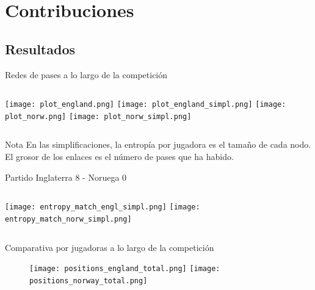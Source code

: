 \documentclass{beamer}
\begin{document}
\section{Contribuciones}

\subsection{Resultados}

\begin{frame}{Redes de pases a lo largo de la competición}
    \begin{columns}[t]
        \texttt{[image: plot\_england.png]}
        \texttt{[image: plot\_england\_simpl.png]}
        \texttt{[image: plot\_norw.png]}
        \texttt{[image: plot\_norw\_simpl.png]}
    \end{columns} 
	\begin{alertblock}{Nota}
		\textlatin{En las simplificaciones, la entropía por jugadora es el tamaño de cada nodo. El grosor de los enlaces es el 
	 	número de pases que ha habido.}
	\end{alertblock}
\end{frame}

\begin{frame}{Partido Inglaterra 8 - Noruega 0}
		\begin{columns}[t]
			\texttt{[image: entropy\_match\_engl\_simpl.png]}
			\texttt{[image: entropy\_match\_norw\_simpl.png]}
		\end{columns} 
	\end{frame}

\begin{frame}{Comparativa por jugadoras a lo largo de la competición}
	\begin{figure}
		\centering
			\texttt{[image: positions\_england\_total.png]}
			\texttt{[image: positions\_norway\_total.png]}
		\end{figure}
\end{frame}
\end{document}
